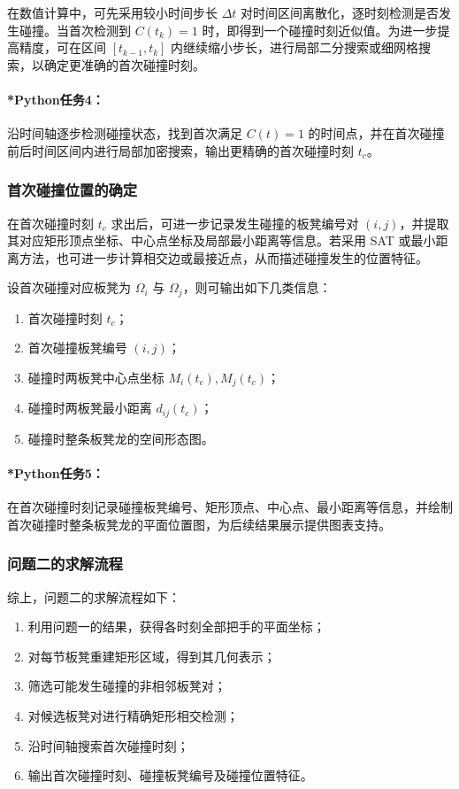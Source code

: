 \documentclass[12pt,a4paper]{ctexart}
\begin{document}
在数值计算中，可先采用较小时间步长 $\Delta t$ 对时间区间离散化，逐时刻检测是否发生碰撞。当首次检测到 $C(t_k)=1$ 时，即得到一个碰撞时刻近似值。为进一步提高精度，可在区间 $[t_{k-1},t_k]$ 内继续缩小步长，进行局部二分搜索或细网格搜索，以确定更准确的首次碰撞时刻。

\paragraph{*Python任务4：}
沿时间轴逐步检测碰撞状态，找到首次满足 $C(t)=1$ 的时间点，并在首次碰撞前后时间区间内进行局部加密搜索，输出更精确的首次碰撞时刻 $t_c$。

\subsubsection{首次碰撞位置的确定}
在首次碰撞时刻 $t_c$ 求出后，可进一步记录发生碰撞的板凳编号对 $(i,j)$，并提取其对应矩形顶点坐标、中心点坐标及局部最小距离等信息。若采用 SAT 或最小距离方法，也可进一步计算相交边或最接近点，从而描述碰撞发生的位置特征。

设首次碰撞对应板凳为 $\Omega_i$ 与 $\Omega_j$，则可输出如下几类信息：
\begin{enumerate}
    \item 首次碰撞时刻 $t_c$；
    \item 首次碰撞板凳编号 $(i,j)$；
    \item 碰撞时两板凳中心点坐标 $M_i(t_c),M_j(t_c)$；
    \item 碰撞时两板凳最小距离 $d_{ij}(t_c)$；
    \item 碰撞时整条板凳龙的空间形态图。
\end{enumerate}

\paragraph{*Python任务5：}
在首次碰撞时刻记录碰撞板凳编号、矩形顶点、中心点、最小距离等信息，并绘制首次碰撞时整条板凳龙的平面位置图，为后续结果展示提供图表支持。

\subsubsection{问题二的求解流程}
综上，问题二的求解流程如下：

\begin{enumerate}
    \item 利用问题一的结果，获得各时刻全部把手的平面坐标；
    \item 对每节板凳重建矩形区域，得到其几何表示；
    \item 筛选可能发生碰撞的非相邻板凳对；
    \item 对候选板凳对进行精确矩形相交检测；
    \item 沿时间轴搜索首次碰撞时刻；
    \item 输出首次碰撞时刻、碰撞板凳编号及碰撞位置特征。
\end{enumerate}
\end{document}
